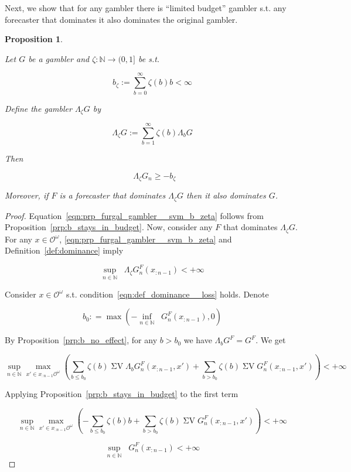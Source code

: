 \documentclass[11pt]{article}
\theoremstyle{definition}
\theoremstyle{plain}
\newtheorem{proposition}{Proposition}%
\newcommand{\Nats}{\mathbb{N}}
\newcommand{\Ob}{\mathcal{O}}
\newcommand{\OO}{\Ob^\omega}
\DeclareMathOperator{\SV}{\Sigma V}
\DeclareMathOperator{\SVM}{\Sigma V_{\min}}
\DeclareMathOperator{\SVX}{\Sigma V_{\max}}
\newcommand{\Bd}{\Lambda}
\begin{document}
Next, we show that for any gambler there is \enquote{limited budget} gambler s.t. any forecaster that dominates it also dominates the original gambler.

\begin{proposition}
\label{prp:frugal_gambler}

Let $G$ be a gambler and $\zeta: \Nats \rightarrow (0,1]$ be s.t.

\begin{equation}
b_\zeta := \sum_{b=0}^\infty \zeta(b) b < \infty
\end{equation}

Define the gambler $\Bd_\zeta G$ by

\begin{equation}
\Bd_\zeta G := \sum_{b = 1}^\infty \zeta(b) \Bd_b G
\end{equation}

Then

\begin{equation}
\label{eqn:prp_furgal_gambler__svm_b_zeta}
\SVM \Bd_\zeta G_n \geq -b_\zeta
\end{equation}

Moreover, if $F$ is a forecaster that dominates $\Bd_\zeta G$ then it also dominates $G$.

\end{proposition}

\begin{proof}

Equation~\ref{eqn:prp_furgal_gambler__svm_b_zeta} follows from Proposition~\ref{prp:b_stays_in_budget}. Now, consider any $F$ that dominates $\Bd_\zeta G$. For any $x \in \OO$, \ref{eqn:prp_furgal_gambler__svm_b_zeta} and Definition~\ref{def:dominance} imply

\[\sup_{n \in \Nats} {\SVX \Bd_\zeta G^F_{n}(x_{:n-1})} < +\infty\]

Consider $x \in \OO$ s.t. condition~\ref{eqn:def_dominance__loss} holds. Denote

\[b_0: = \max( -\inf_{n \in \Nats} {\SVM G^F_{n}(x_{:n-1})},0)\]

By Proposition~\ref{prp:b_no_effect}, for any $b > b_0$ we have $\Bd_b G^F = G^F$. We get

\[\sup_{n \in \Nats} \max_{x' \in x_{:n-1}\OO} (\sum_{b \leq b_0} \zeta(b) {\SV \Bd_b G^F_{n}(x_{:n-1},x')} + \sum_{b > b_0} \zeta(b) \SV G^F_{n}(x_{:n-1},x')) < +\infty\]

Applying Proposition~\ref{prp:b_stays_in_budget} to the first term

\[\sup_{n \in \Nats} \max_{x' \in x_{:n-1}\OO} (-\sum_{b \leq b_0} \zeta(b) b + \sum_{b > b_0} \zeta(b) \SV G^F_{n}(x_{:n-1},x')) < +\infty\]

\[\sup_{n \in \Nats} \SVX G^F_{n}(x_{:n-1}) < +\infty\]
\end{proof}
\end{document}
